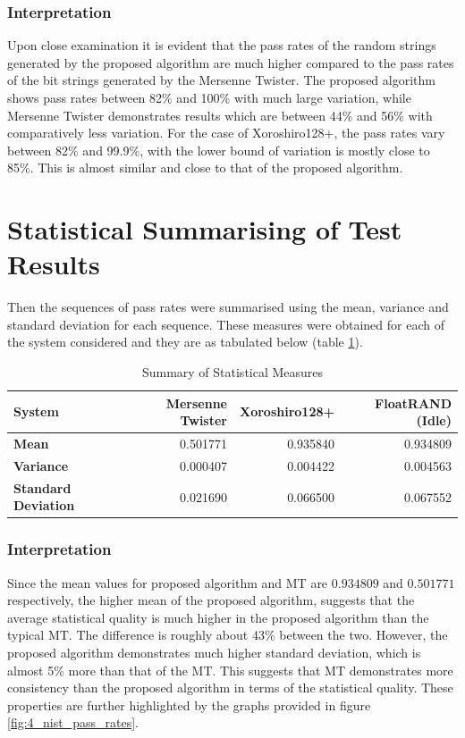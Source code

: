 \subsubsection{Interpretation}

Upon close examination it is evident that the pass rates of the random strings generated by the proposed algorithm are much higher compared to the pass rates of the bit strings generated by the Mersenne Twister. The proposed algorithm shows pass rates between 82\% and 100\% with much large variation, while Mersenne Twister demonstrates results which are between 44\% and 56\% with comparatively less variation. For the case of Xoroshiro128+, the pass rates vary between 82\% and 99.9\%, with the lower bound of variation is mostly close to 85\%. This is almost similar and close to that of the proposed algorithm.

\section{Statistical Summarising of Test Results}

Then the sequences of pass rates were summarised using the mean, variance and standard deviation for each sequence. These measures were obtained for each of the system considered and they are as tabulated below (table \ref{tbl:5_stat_summary}).

\begin{table}[h!]
    \centering
    \scriptsize
    \begin{tabular}{|l|r|r|r|}
        \hline
        \textbf{System} & \textbf{Mersenne Twister} & \textbf{Xoroshiro128+} & \textbf{FloatRAND (Idle)} \\ \hline
        \textbf{Mean} & 0.501771 & 0.935840 & 0.934809 \\ \hline
        \textbf{Variance} & 0.000407 & 0.004422 & 0.004563 \\ \hline
        \textbf{Standard Deviation} & 0.021690 & 0.066500 & 0.067552 \\ \hline
    \end{tabular}
    \caption{Summary of Statistical Measures}
    \label{tbl:5_stat_summary}
\end{table}

\subsubsection{Interpretation}

Since the mean values for proposed algorithm and MT are $0.934809 $ and $0.501771$ respectively, the higher mean of the proposed algorithm, suggests that the average statistical quality is much higher in the proposed algorithm than the typical MT. The difference is roughly about 43\% between the two. However, the proposed algorithm demonstrates much higher standard deviation, which is almost 5\% more than that of the MT. This suggests that MT demonstrates more consistency than the proposed algorithm in terms of the statistical quality. These properties are further highlighted by the graphs provided in figure \ref{fig:4_nist_pass_rates}.

